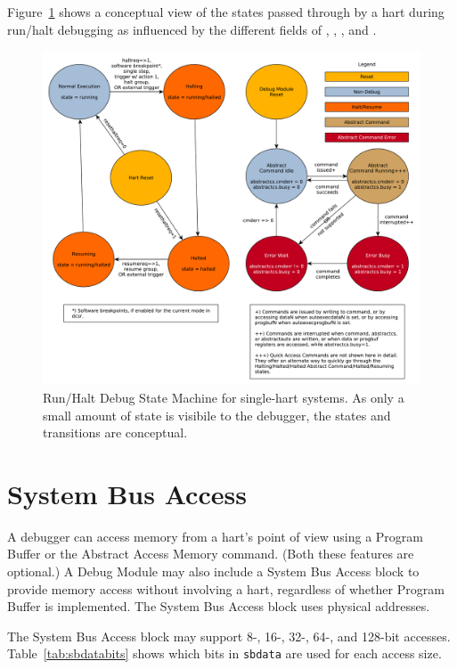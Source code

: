 Figure~\ref{fig:abstract_sm} shows a conceptual view of the states
passed through by a hart during run/halt debugging as influenced
by the different fields of \Rdmcontrol, \Rabstractcs, \Rabstractauto, and
\Rcommand.

\begin{figure}
   \centering
   \includegraphics[width=\textwidth]{fig/abstract_commands.pdf}
   \caption[Run/Halt Debug State Machine]{Run/Halt Debug State Machine for single-hart systems.
     As only a small amount of state is visibile to the debugger,
     the states and transitions are conceptual.}
   \label{fig:abstract_sm}
\end{figure}

\section{System Bus Access} \label{systembusaccess}

A debugger can access memory from a hart's point of view using a Program Buffer or
the Abstract Access Memory command. (Both these features are optional.)
A Debug Module may also include a System Bus Access block to provide memory
access without
involving a hart, regardless of whether Program Buffer is implemented.
The System Bus Access block uses physical addresses.

The System Bus Access block may support 8-, 16-, 32-, 64-, and 128-bit
accesses. Table~\ref{tab:sbdatabits} shows which bits in {\tt sbdata} are used
for each access size.

